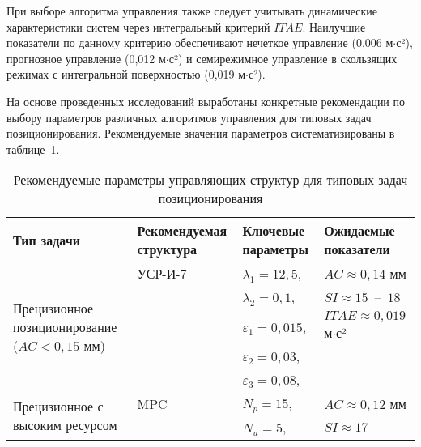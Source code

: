 При выборе алгоритма управления также следует учитывать динамические характеристики
систем через интегральный критерий $ITAE$. Наилучшие показатели по данному критерию
обеспечивают нечеткое управление (0,006 м$\cdot$с²), прогнозное управление (0,012 м$\cdot$с²)
и семирежимное управление в скользящих режимах с интегральной поверхностью (0,019 м$\cdot$с²).

На основе проведенных исследований выработаны конкретные рекомендации по выбору
параметров различных алгоритмов управления для типовых задач позиционирования.
Рекомендуемые значения параметров систематизированы в таблице~\ref{tab:recommended_parameters}.

\begin{table}[ht]
	\centering
	\caption{Рекомендуемые параметры управляющих структур для типовых задач позиционирования}
	\label{tab:recommended_parameters}
	\scriptsize
	\begin{tabular}{p{3.5cm}p{3cm}p{4cm}p{4cm}}
		\midrule
		\textbf{Тип задачи}                                               & \textbf{Рекомендуемая структура} & \textbf{Ключевые параметры} & \textbf{Ожидаемые показатели}   \\
		\midrule
		\multirow{5}{3.5cm}{Прецизионное позиционирование ($AC<0,15$ мм)} & УСР-И-7                          & $\lambda_1=12,5$,           & $AC \approx 0,14$ мм            \\
		                                                                  &                                  & $\lambda_2=0,1$,            & $SI \approx 15$~--~$18$         \\
		                                                                  &                                  & $\varepsilon_1=0,015$,      & $ITAE \approx 0,019$ м$\cdot$с² \\
		                                                                  &                                  & $\varepsilon_2=0,03$,       &                                 \\
		                                                                  &                                  & $\varepsilon_3=0,08$,       &                                 \\
		\hline
		\multirow{5}{3.5cm}{Прецизионное с высоким ресурсом}              & MPC                              & $N_p=15$,                   & $AC \approx 0,12$ мм            \\
		                                                                  &                                  & $N_u=5$,                    & $SI \approx 17$                 \\

\end{tabular}
\end{table}
